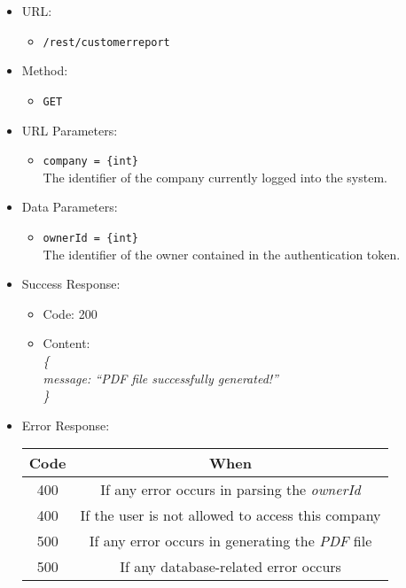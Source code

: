 \begin{itemize}
    
    \item URL: 
    \begin{itemize}
        \item \texttt{/rest/customerreport}
    \end{itemize}
    
    \item Method: 
    \begin{itemize}
        \item \texttt{GET}
    \end{itemize}
    
    \item URL Parameters: 
    \begin{itemize}
        \item \texttt{company = \{int\}} \\
        The identifier of the company currently logged into the system.
    \end{itemize}
    
    \item Data Parameters: 
    \begin{itemize}
        \item \texttt{ownerId = \{int\}} \\
        The identifier of the owner contained in the authentication token.
    \end{itemize}
    
    \item Success Response: 
    \begin{itemize}
        \item Code: 200
        \item Content: \\
        \textit{
\{ \\
    message: “PDF file successfully generated!” \\
\}
        }
    \end{itemize}
    
    \item Error Response:
    \begin{table}[!h]
    \centering 
    \begin{tabular}{|c|c|}
    \hline
    \multicolumn{1}{|c|}{\textbf{Code}} & \multicolumn{1}{c|}{\textbf{When}} \\ \hline
    400 & If any error occurs in parsing the \textit{ownerId}  \\\hline
    400 & If the user is not allowed to access this company \\\hline
    500 & If any error occurs in generating the \textit{PDF} file \\\hline
    500 & If any database-related error occurs \\\hline
    \end{tabular} 
    \end{table} 
    
\end{itemize}


